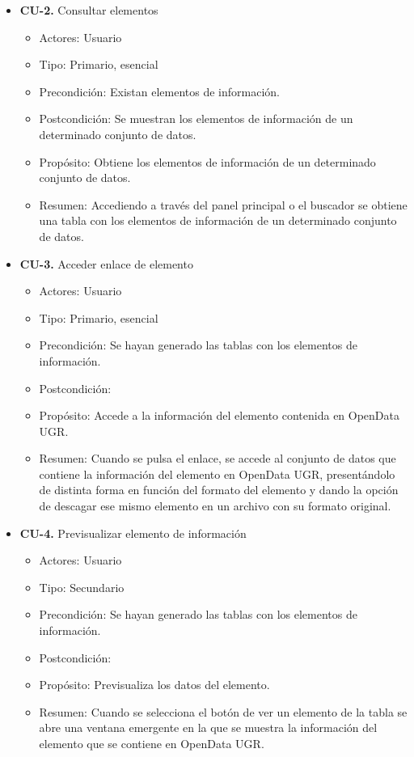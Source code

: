 \begin{itemize}
 \item \textbf{CU-2.} Consultar elementos
 \begin{itemize}
  \item Actores: Usuario
  \item Tipo: Primario, esencial
  \item Precondición: Existan elementos de información.
  \item Postcondición: Se muestran los elementos de información de un determinado conjunto de datos.
  \item Propósito: Obtiene los elementos de información de un determinado conjunto de datos.
  \item Resumen: Accediendo a través del panel principal o el buscador se obtiene una tabla con los elementos de información
  de un determinado conjunto de datos.
 \end{itemize}
\end{itemize}

\begin{itemize}
 \item \textbf{CU-3.} Acceder enlace de elemento
 \begin{itemize}
  \item Actores: Usuario
  \item Tipo: Primario, esencial
  \item Precondición: Se hayan generado las tablas con los elementos de información.
  \item Postcondición: 
  \item Propósito: Accede a la información del elemento contenida en OpenData UGR.
  \item Resumen: Cuando se pulsa el enlace, se accede al conjunto de datos que contiene la información del elemento en OpenData
  UGR, presentándolo de distinta forma en función del formato del elemento y dando la opción de descagar ese mismo elemento en 
  un archivo con su formato original.
 \end{itemize}
\end{itemize}

\begin{itemize}
 \item \textbf{CU-4.} Previsualizar elemento de información
 \begin{itemize}
  \item Actores: Usuario
  \item Tipo: Secundario
  \item Precondición: Se hayan generado las tablas con los elementos de información.
  \item Postcondición: 
  \item Propósito: Previsualiza los datos del elemento.
  \item Resumen: Cuando se selecciona el botón de ver un elemento de la tabla se abre una ventana emergente en la que se 
  muestra la información del elemento que se contiene en OpenData UGR.
 \end{itemize}
\end{itemize}

